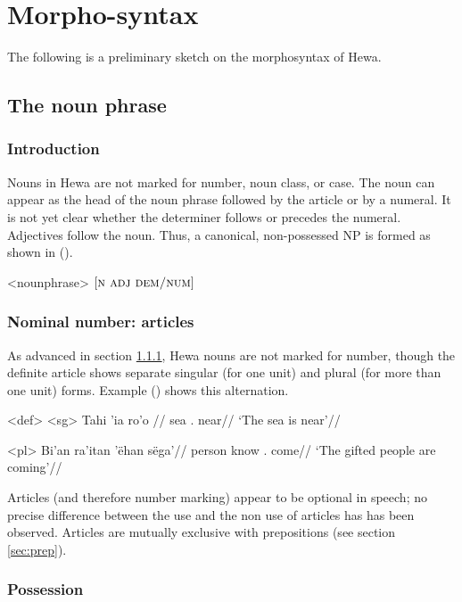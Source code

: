 \documentclass[../hewa_main-subfiles.tex]{subfiles}
\begin{document}
\section{Morpho-syntax}

The following is a preliminary sketch on the morphosyntax of Hewa.

\subsection{The noun phrase}\label{sec:nphr}

\subsubsection{Introduction}\label{sec:nphr.intr}

Nouns in Hewa are not marked for number, noun class, or case. The noun can appear as the head of the noun phrase followed by the article or by a numeral. It is not yet clear whether the determiner follows or precedes the numeral. Adjectives follow the noun. Thus, a canonical, non-possessed NP is formed as shown in ().

\ex<nounphrase>
$[\textsc{n adj dem/num}]$
\xe

\subsubsection{Nominal number: articles}\label{sec:num}

As advanced in section \ref{sec:nphr.intr}, Hewa nouns are not marked for number, though the definite article shows separate singular (for one unit) and plural (for more than one unit) forms. Example () shows this alternation.

\pex<def> %
\a<sg> %
\begingl %
\gla Tahi 'ia ro'o //
\glb sea \Def{}.\Sg{} near//
\glft `The sea is near'//
\endgl

\a<pl> %
\begingl %
\gla Bi'an ra'itan 'ëhan  sëga'//
\glb person know \Def{}.\Pl{} come//
\glft `The gifted people are coming'// 
\endgl
\xe

Articles (and therefore number marking) appear to be optional in speech; no precise difference between the use and the non use of articles has has been observed. Articles are mutually exclusive with prepositions (see section \ref{sec:prep}).

\subsubsection{Possession}
\end{document}
